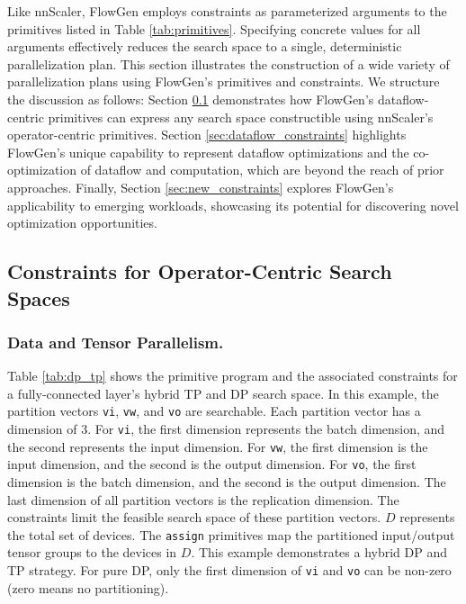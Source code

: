 Like nnScaler, FlowGen employs constraints as parameterized arguments to the primitives listed in Table \ref{tab:primitives}. Specifying concrete values for all arguments effectively reduces the search space to a single, deterministic parallelization plan. This section illustrates the construction of a wide variety of parallelization plans using FlowGen's primitives and constraints.  We structure the discussion as follows: Section \ref{sec:operator_constraints} demonstrates how FlowGen's dataflow-centric primitives can express any search space constructible using nnScaler's operator-centric primitives. Section \ref{sec:dataflow_constraints} highlights FlowGen's unique capability to represent dataflow optimizations and the co-optimization of dataflow and computation, which are beyond the reach of prior approaches. Finally, Section \ref{sec:new_constraints} explores FlowGen's applicability to emerging workloads, showcasing its potential for discovering novel optimization opportunities.


\subsection{Constraints for Operator-Centric Search Spaces}
\label{sec:operator_constraints}

\subsubsection{Data and Tensor Parallelism.} 

Table \ref{tab:dp_tp} shows the primitive program and the associated constraints for a fully-connected layer's hybrid TP and DP search space. In this example, the partition vectors \texttt{vi}, \texttt{vw}, and \texttt{vo} are searchable. Each partition vector has a dimension of 3. For \texttt{vi}, the first dimension represents the batch dimension, and the second represents the input dimension. For \texttt{vw}, the first dimension is the input dimension, and the second is the output dimension. For \texttt{vo}, the first dimension is the batch dimension, and the second is the output dimension. The last dimension of all partition vectors is the replication dimension. The constraints limit the feasible search space of these partition vectors. $D$ represents the total set of devices. The \texttt{assign} primitives map the partitioned input/output tensor groups to the devices in $D$. This example demonstrates a hybrid DP and TP strategy. For pure DP, only the first dimension of \texttt{vi} and \texttt{vo} can be non-zero (zero means no partitioning).

